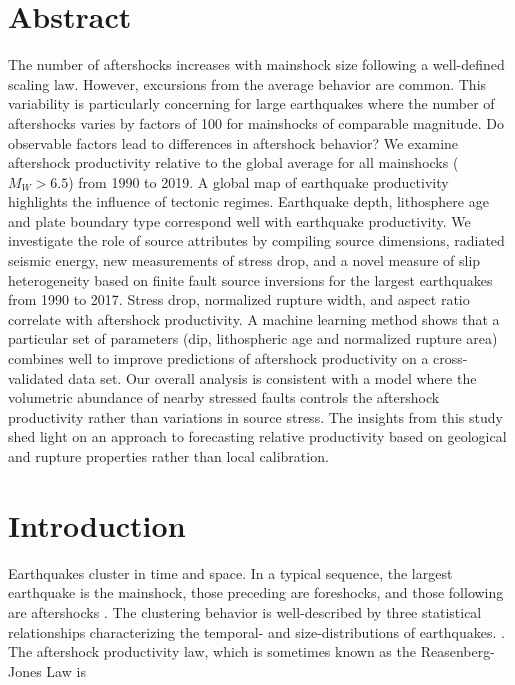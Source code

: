 \documentclass[draft, jgrga]{agujournal2018}
\begin{document}
\newpage

\justify

\section*{Abstract}

 The number of aftershocks increases with mainshock size following a well-defined scaling law. However, excursions from the average behavior are common. This variability is particularly concerning for large earthquakes where the number of aftershocks varies by factors of 100 for mainshocks of comparable magnitude. Do observable factors lead to differences in aftershock behavior? We examine aftershock productivity relative to the global average for all mainshocks ($M_W>6.5$) from 1990 to 2019. A global map of earthquake productivity highlights the influence of tectonic regimes. Earthquake depth, lithosphere age and plate boundary type correspond well with earthquake productivity. We investigate the role of source attributes by compiling source dimensions, radiated seismic energy, new measurements of stress drop, and a novel measure of slip heterogeneity based on finite fault source inversions for the largest earthquakes from 1990 to 2017. Stress drop, normalized rupture width, and aspect ratio correlate with aftershock productivity. A machine learning method shows that a particular set of parameters (dip, lithospheric age and normalized rupture area) combines well to improve predictions of aftershock productivity on a cross-validated data set. Our overall analysis is consistent with a model where the volumetric abundance of nearby stressed faults controls the aftershock productivity rather than variations in source stress. The insights from this study shed light on an approach to forecasting relative productivity based on geological and rupture properties rather than local calibration.

\section{Introduction}

Earthquakes cluster in time and space. In a typical sequence, the largest earthquake is the mainshock, those preceding are foreshocks, and those following are aftershocks \citep{Omori1895}. The clustering behavior is well-described by three statistical relationships characterizing the temporal- and size-distributions of earthquakes. \citep[e.g.,][]{Ogata1988}. The aftershock productivity law, which is sometimes known as the Reasenberg-Jones Law is
\end{document}
